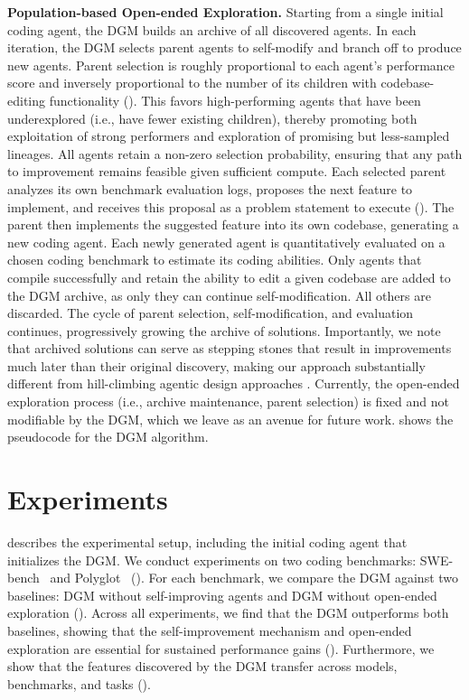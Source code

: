 \documentclass{article}
\begin{document}
\textbf{Population-based Open-ended Exploration.}
Starting from a single initial coding agent, the DGM builds an archive of all discovered agents. In each iteration, the DGM selects parent agents to self-modify and branch off to produce new agents. Parent selection is roughly proportional to each agent's performance score and inversely proportional to the number of its children with codebase-editing functionality (). This favors high-performing agents that have been underexplored (i.e., have fewer existing children), thereby promoting both exploitation of strong performers and exploration of promising but less-sampled lineages. All agents retain a non-zero selection probability, ensuring that any path to improvement remains feasible given sufficient compute. 
Each selected parent analyzes its own benchmark evaluation logs, proposes the next feature to implement, and receives this proposal as a problem statement to execute (). The parent then implements the suggested feature into its own codebase, generating a new coding agent. Each newly generated agent is quantitatively evaluated on a chosen coding benchmark to estimate its coding abilities. Only agents that compile successfully and retain the ability to edit a given codebase are added to the DGM archive, as only they can continue self-modification. All others are discarded. The cycle of parent selection, self-modification, and evaluation continues, progressively growing the archive of solutions. Importantly, we note that archived solutions can serve as stepping stones that result in improvements much later than their original discovery, making our approach substantially different from hill-climbing agentic design approaches \citep{robeyns2025self}. Currently, the open-ended exploration process (i.e., archive maintenance, parent selection) is fixed and not modifiable by the DGM, which we leave as an avenue for future work.  shows the pseudocode for the DGM algorithm.


\section{Experiments}
\label{sec:experiments}


 describes the experimental setup, including the initial coding agent that initializes the DGM. We conduct experiments on two coding benchmarks: SWE-bench~\citep{jimenez2024swebench} and Polyglot~\citep{gauthier2024polyglot} (). For each benchmark, we compare the DGM against two baselines: DGM without self-improving agents and DGM without open-ended exploration (). Across all experiments, we find that the DGM outperforms both baselines, showing that the self-improvement mechanism and open-ended exploration are essential for sustained performance gains (). Furthermore, we show that the features discovered by the DGM transfer across models, benchmarks, and tasks ().
\end{document}
